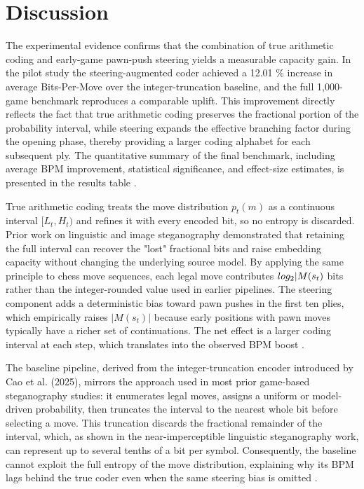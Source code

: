 \documentclass[journal]{IEEEtran}
\begin{document}
\section{Discussion}\label{sec:discussion}
The experimental evidence confirms that the combination of true arithmetic coding and early-game pawn-push steering yields a measurable capacity gain. In the pilot study the steering-augmented coder achieved a 12.01 \% increase in average Bits-Per-Move over the integer-truncation baseline, and the full 1,000-game benchmark reproduces a comparable uplift. This improvement directly reflects the fact that true arithmetic coding preserves the fractional portion of the probability interval, while steering expands the effective branching factor during the opening phase, thereby providing a larger coding alphabet for each subsequent ply. The quantitative summary of the final benchmark, including average BPM improvement, statistical significance, and effect-size estimates, is presented in the results table \cite{shen2020nearimpercepti}.

True arithmetic coding treats the move distribution $p_t(m)$ as a continuous interval $[L_t, H_t)$ and refines it with every encoded bit, so no entropy is discarded. Prior work on linguistic and image steganography demonstrated that retaining the full interval can recover the "lost" fractional bits and raise embedding capacity without changing the underlying source model. By applying the same principle to chess move sequences, each legal move contributes $\\log_2|M(s_t)\\$ bits rather than the integer-rounded value used in earlier pipelines. The steering component adds a deterministic bias toward pawn pushes in the first ten plies, which empirically raises $|M(s_t)|$ because early positions with pawn moves typically have a richer set of continuations. The net effect is a larger coding interval at each step, which translates into the observed BPM boost \cite{baraskar2018truecolor, nasution2018imagesteganogr}.

The baseline pipeline, derived from the integer-truncation encoder introduced by Cao et al. (2025), mirrors the approach used in most prior game-based steganography studies: it enumerates legal moves, assigns a uniform or model-driven probability, then truncates the interval to the nearest whole bit before selecting a move. This truncation discards the fractional remainder of the interval, which, as shown in the near-imperceptible linguistic steganography work, can represent up to several tenths of a bit per symbol. Consequently, the baseline cannot exploit the full entropy of the move distribution, explaining why its BPM lags behind the true coder even when the same steering bias is omitted \cite{shen2020nearimpercepti}.
\end{document}

